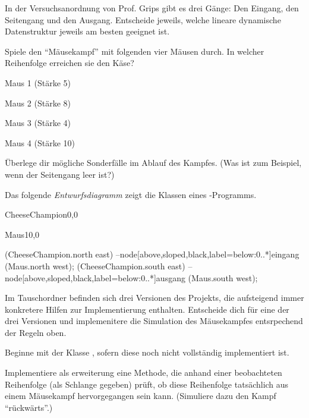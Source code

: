 \documentclass[10pt, a4paper, ngerman]{arbeitsblatt}
\begin{document}
\begin{aufgabe}
\begin{teilaufgaben}
	\teilaufgabe
	In der Versuchsanordnung von Prof. Grips gibt es drei Gänge: Den Eingang, den Seitengang und den Ausgang. Entscheide jeweils, welche lineare dynamische Datenstruktur jeweils am besten geeignet ist.

	\teilaufgabe
	Spiele den \enquote{Mäusekampf} mit folgenden vier Mäusen durch. In welcher Reihenfolge erreichen sie den Käse?

	\begin{multicols}{4}
		Maus 1 (Stärke 5)

		Maus 2 (Stärke 8)

		Maus 3 (Stärke 4)

		Maus 4 (Stärke 10)
	\end{multicols}

	Überlege dir mögliche Sonderfälle im Ablauf des Kampfes. (Was ist zum Beispiel, wenn der Seitengang leer ist?)

	\teilaufgabe
	Das folgende \emph{Entwurfsdiagramm} zeigt die Klassen eines -Programms.

	\begin{center}
		\begin{klassendiagramm}
			\begin{class}[text width=3cm]{CheeseChampion}{0,0}
			\end{class}
			\begin{class}[text width=3cm]{Maus}{10,0}
			\end{class}
			 (CheeseChampion.north east) --node[above,sloped,black,label=below:0..*]{eingang} (Maus.north west);
			 (CheeseChampion.south east) --node[above,sloped,black,label=below:0..*]{ausgang} (Maus.south west);
		\end{klassendiagramm}
	\end{center}

	Im Tauschordner befinden sich drei Versionen des Projekts, die aufsteigend immer konkretere Hilfen zur Implementierung enthalten. Entscheide dich für eine der drei Versionen und implemenitere die Simulation des Mäusekampfes entsrpechend der Regeln oben.

	Beginne mit der Klasse , sofern diese noch nicht vollständig implementiert ist.

	\teilaufgabe
	Implementiere als erweiterung eine Methode, die anhand einer beobachteten Reihenfolge (als Schlange gegeben) prüft, ob diese Reihenfolge tatsächlich aus einem Mäusekampf hervorgegangen sein kann. (Simuliere dazu den Kampf \enquote{rückwärts}.)
\end{teilaufgaben}
\end{aufgabe}
\end{document}

